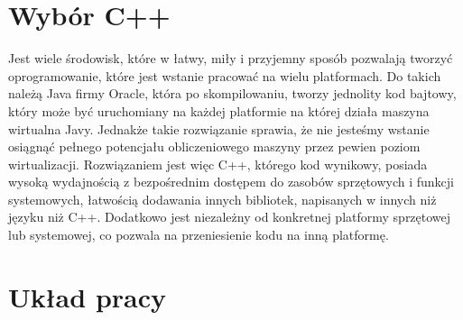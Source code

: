 \section{Wybór C++}

Jest wiele środowisk, które w łatwy, miły i przyjemny sposób pozwalają tworzyć oprogramowanie, które jest wstanie pracować na wielu platformach.
Do takich należą Java firmy Oracle, która po skompilowaniu, tworzy jednolity kod bajtowy, który może być uruchomiany na każdej platformie na której działa maszyna wirtualna Javy.
Jednakże takie rozwiązanie sprawia, że nie jesteśmy wstanie osiągnąć pełnego potencjału obliczeniowego maszyny przez pewien poziom wirtualizacji.
Rozwiązaniem jest więc C++, którego kod wynikowy, posiada wysoką wydajnością z bezpośrednim dostępem do zasobów sprzętowych i funkcji systemowych, łatwością dodawania innych bibliotek, napisanych w innych niż języku niż C++.
Dodatkowo jest niezależny od konkretnej platformy sprzętowej lub systemowej, co pozwala na przeniesienie kodu na inną platformę.

\section{Układ pracy}